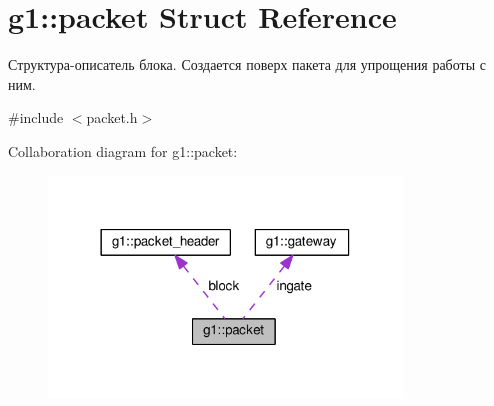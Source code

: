 \hypertarget{structg1_1_1packet}{}\section{g1\+:\+:packet Struct Reference}
\label{structg1_1_1packet}


Структура-\/описатель блока. Создается поверх пакета для упрощения работы с ним.  




{\ttfamily \#include $<$packet.\+h$>$}



Collaboration diagram for g1\+:\+:packet\+:\nopagebreak
\begin{figure}[H]
\begin{center}
\leavevmode
\includegraphics[width=266pt]{structg1_1_1packet__coll__graph}
\end{center}
\end{figure}
